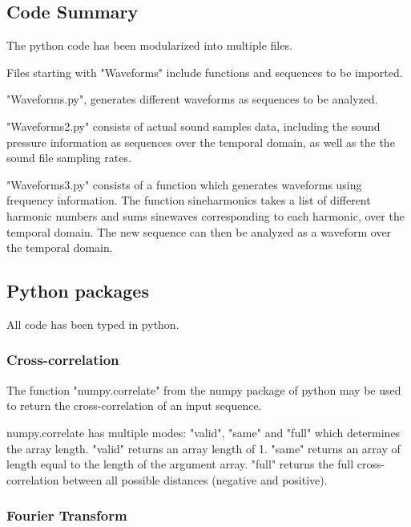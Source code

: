\documentclass[12pt]{article}
\begin{document}
\subsection{Code Summary}

The python code has been modularized into multiple files.\newline

Files starting with "Waveforms" include functions and sequences to be imported.\newline

"Waveforms.py", generates different waveforms as sequences to be analyzed.\newline

"Waveforms2.py" consists of actual sound samples data, including the sound pressure information as sequences over the temporal domain, as well as the the sound file sampling rates.\newline

"Waveforms3.py" consists of a function which generates waveforms using frequency information. The function sineharmonics takes a list of different harmonic numbers and sums sinewaves corresponding to each harmonic, over the temporal domain. The new sequence can then be analyzed as a waveform over the temporal domain.

\subsection{Python packages}

All code has been typed in python.\newline

\subsubsection{Cross-correlation}

The function "numpy.correlate" from the numpy package of python may be used to return the cross-correlation of an input sequence.\cite{ab}

numpy.correlate has multiple modes: "valid", "same" and "full" which determines the array length. "valid" returns an array length of 1.\cite{ab} "same" returns an array of length equal to the length of the argument array.\cite{ab} "full" returns the full cross-correlation between all possible distances (negative and positive).\cite{ab}

\subsubsection{Fourier Transform}
\end{document}
